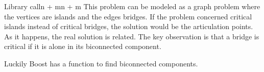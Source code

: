 \documentclass{writeup}
\begin{document}
\begin{solutions}
  \begin{solution}{Library call}{n + m}{n + m}
    This problem can be modeled as a graph problem where the vertices are islands and the edges bridges.
    If the problem concerned critical islands instead of critical bridges, the solution would be the articulation points.
    As it happens, the real solution is related.
    The key observation is that a bridge is critical if it is alone in its biconnected component.

    Luckily Boost has a function to find biconnected components.
  \end{solution}
\end{solutions}
\end{document}

